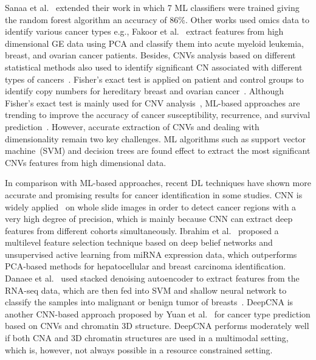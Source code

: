 \hspace*{3.5mm} Sanaa et al.~\cite{elsadek2018supervised} extended their work in which 7 ML classifiers were trained giving the random forest algorithm an accuracy of 86\%. Other works used omics data to identify various cancer types e.g., Fakoor et al.~\cite{fakoor} extract features from high dimensional GE data using PCA and classify them into acute myeloid leukemia, breast, and ovarian cancer patients. Besides, CNVs analysis based on different statistical methods also used to identify significant CN associated with different types of cancers~\cite{cancernet}. Fisher's exact test is applied on patient and control groups to identify copy numbers for hereditary breast and ovarian cancer~\cite{58Kuusisto}. Although Fisher's exact test is mainly used for CNV analysis~\cite{fish}, ML-based approaches are trending to improve the accuracy of cancer susceptibility, recurrence, and survival prediction~\cite{16Kourou}. However, accurate extraction of CNVs and dealing with dimensionality remain two key challenges. ML algorithms such as support vector machine~(SVM) and decision trees are found effect to extract the most significant CNVs features from high dimensional data. 

\hspace*{3.5mm} In comparison with ML-based approaches, recent DL techniques have shown more accurate and promising results for cancer identification in some studies. CNN is widely applied~\cite{19Cruz} on whole slide images in order to detect cancer regions with a very high degree of precision, which is mainly because CNN can extract deep features from different cohorts simultaneously. Ibrahim et al.~\cite{ibrahim} proposed a multilevel feature selection technique based on deep belief networks and unsupervised active learning from miRNA expression data, which outperforms PCA-based methods for hepatocellular and breast carcinoma identification. Danaee et al.~\cite{17Danaee} used stacked denoising autoencoder to extract features from the RNA-seq data, which are then fed into SVM and shallow neural network to classify the samples into malignant or benign tumor of breasts~\cite{18Chen}. DeepCNA is another CNN-based approach proposed by Yuan et al.~\cite{yuan2018cancer} for cancer type prediction based on CNVs and chromatin 3D structure. DeepCNA performs moderately well if both CNA and 3D chromatin structures are used in a multimodal setting, which is, however, not always possible in a resource constrained setting. %

